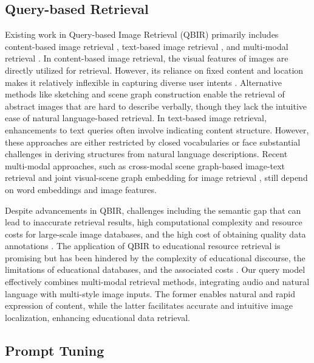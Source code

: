 \subsection{Query-based Retrieval}
Existing work in Query-based Image Retrieval (QBIR) primarily includes content-based image retrieval \cite{chen2022deep}, text-based image retrieval \cite{li2011text}, and multi-modal retrieval \cite{neculai2022probabilistic}. In content-based image retrieval, the visual features of images are directly utilized for retrieval. However, its reliance on fixed content and location makes it relatively inflexible in capturing diverse user intents \cite{lee-etal-2024-interactive}. Alternative methods like sketching \cite{chowdhury2022fs, chowdhury2023scenetrilogy} and scene graph construction \cite{johnson2015image} enable the retrieval of abstract images that are hard to describe verbally, though they lack the intuitive ease of natural language-based retrieval. In text-based image retrieval, enhancements to text queries often involve indicating content structure. However, these approaches are either restricted by closed vocabularies \cite{mai2017spatial, kilickaya2021structured} or face substantial challenges \cite{li2017generating} in deriving structures from natural language descriptions. Recent multi-modal approaches, such as cross-modal scene graph-based image-text retrieval \cite{wang2020cross} and joint visual-scene graph embedding for image retrieval \cite{belilovsky2017joint}, still depend on word embeddings and image features.

Despite advancements in QBIR, challenges including the semantic gap that can lead to inaccurate retrieval results, high computational complexity and resource costs for large-scale image databases, and the high cost of obtaining quality data annotations \cite{li-etal-2024-generative}. The application of QBIR to educational resource retrieval is promising but has been hindered by the complexity of educational discourse, the limitations of educational databases, and the associated costs \cite{zhou-etal-2024-vista}.  Our query model effectively combines multi-modal retrieval methods, integrating audio and natural language with multi-style image inputs. The former enables natural and rapid expression of content, while the latter facilitates accurate and intuitive image localization, enhancing educational data retrieval.

\subsection{Prompt Tuning}

